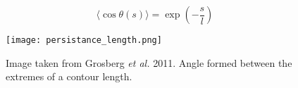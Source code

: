 \begin{equation} \label{eq: contour length mean angle}
    \langle \cos{\theta(s)}\rangle = \exp{\left(-\frac{s}{l}\right)}
\end{equation}

\begin{figure}[H] 
    \centering 
    \texttt{[image: persistance\_length.png]} 
    \caption{Image taken from Grosberg \textit{et al.} 2011\cite{grosbergGiantMoleculesHere2011}. Angle formed between the extremes of a contour length.} 
    \label{examplelabel} 
\end{figure}
